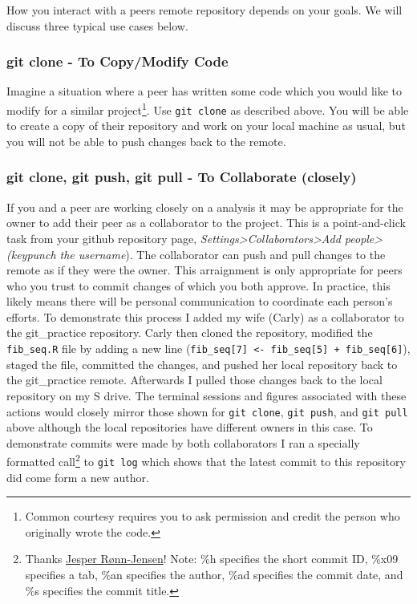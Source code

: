 \documentclass[
  letterpaper,
  DIV=11,
  numbers=noendperiod]{scrreprt}
\begin{document}
How you interact with a peers remote repository depends on your goals.
We will discuss three typical use cases below.

\hypertarget{git-clone---to-copymodify-code}{%
\subsubsection{git clone - To Copy/Modify
Code}\label{git-clone---to-copymodify-code}}

Imagine a situation where a peer has written some code which you would
like to modify for a similar project\footnote{Common courtesy requires
  you to ask permission and credit the person who originally wrote the
  code.}. Use \texttt{git\ clone} as described above. You will be able
to create a copy of their repository and work on your local machine as
usual, but you will not be able to push changes back to the remote.

\hypertarget{git-clone-git-push-git-pull---to-collaborate-closely}{%
\subsubsection{git clone, git push, git pull - To Collaborate
(closely)}\label{git-clone-git-push-git-pull---to-collaborate-closely}}

If you and a peer are working closely on a analysis it may be
appropriate for the owner to add their peer as a collaborator to the
project. This is a point-and-click task from your github repository
page, \emph{Settings\textgreater Collaborators\textgreater Add
people\textgreater(keypunch the username}). The collaborator can push
and pull changes to the remote as if they were the owner. This
arraignment is only appropriate for peers who you trust to commit
changes of which you both approve. In practice, this likely means there
will be personal communication to coordinate each person's efforts. To
demonstrate this process I added my wife (Carly) as a collaborator to
the git\_practice repository. Carly then cloned the repository, modified
the \texttt{fib\_seq.R} file by adding a new line
(\texttt{fib\_seq{[}7{]}\ \textless{}-\ fib\_seq{[}5{]}\ +\ fib\_seq{[}6{]}}),
staged the file, committed the changes, and pushed her local repository
back to the git\_practice remote. Afterwards I pulled those changes back
to the local repository on my S drive. The terminal sessions and figures
associated with these actions would closely mirror those shown for
\texttt{git\ clone}, \texttt{git\ push}, and \texttt{git\ pull} above
although the local repositories have different owners in this case. To
demonstrate commits were made by both collaborators I ran a specially
formatted call\footnote{Thanks
  \href{https://stackoverflow.com/questions/1441010/the-shortest-possible-output-from-git-log-containing-author-and-date}{Jesper
  Rønn-Jensen}! Note: \%h specifies the short commit ID, \%x09 specifies
  a tab, \%an specifies the author, \%ad specifies the commit date, and
  \%s specifies the commit title.} to \texttt{git\ log} which shows that
the latest commit to this repository did come form a new author.
\end{document}
